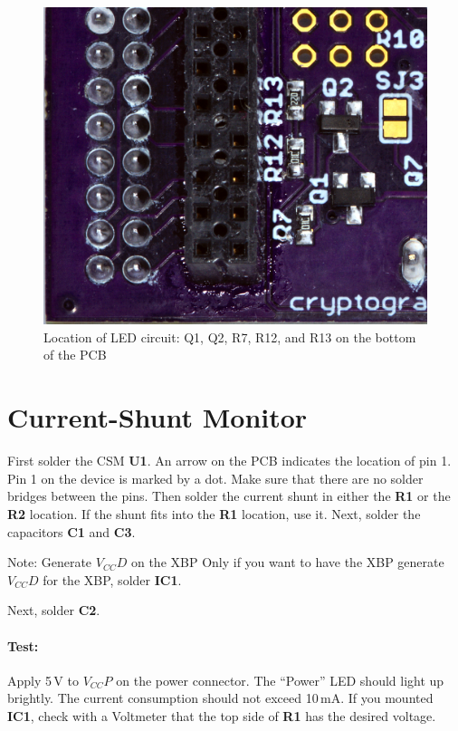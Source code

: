\documentclass[twoside,11pt]{cergdoc}
\begin{document}
\begin{figure}[ht]
  \begin{center}
    \includegraphics[scale=0.8]{figures/xbp-led-circuit}
    \caption{Location of LED circuit: Q1, Q2, R7, R12, and R13 on the bottom of the PCB}
  \end{center}
\end{figure}

\section{Current-Shunt Monitor}
First solder the CSM \textbf{U1}. 
An arrow on the PCB indicates the location of pin 1. Pin 1 on the device 
is marked by a dot. Make sure that there are no solder bridges between the
pins. Then solder the current shunt in either the \textbf{R1} or the
\textbf{R2} location. If the shunt fits into the \textbf{R1} location, use it.
Next, solder the capacitors \textbf{C1} and \textbf{C3}.

\begin{cergbox}{Note: Generate $V_{CC}D$ on the XBP}
Only if you want to have the XBP generate $V_{CC}D$ for the XBP, solder \textbf{IC1}.
\end{cergbox}

\noindent Next, solder \textbf{C2}.

\paragraph{Test:} Apply 5\,V to $V_{CC}P$ on the power connector. The ``Power''
LED should light up brightly. The current consumption should not exceed 
10\,mA. If you mounted \textbf{IC1}, check with a Voltmeter that the top side
of \textbf{R1} has the desired voltage.
\end{document}

